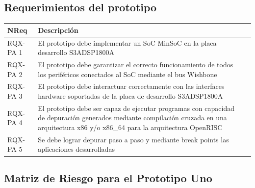 		\subsection{Requerimientos del prototipo}
		\begin{table}[h]
		\centering
		\begin{tabular}{ p{2.5cm} p{8cm} p{3cm} }
		\hline 
		\rowcolor[gray]{0.8} N\textordmasculine Req & Descripción\\
		\hline 
		RQX-PA 1 & El prototipo debe implementar un SoC MinSoC en la placa desarrollo S3ADSP1800A\\ 
		\hline 
		RQX-PA 2 & El prototipo debe garantizar el correcto funcionamiento de todos los periféricos conectados al SoC mediante el bus Wishbone\\ 
		\hline 
		RQX-PA 3 & El prototipo debe interactuar correctamente con las interfaces hardware soportadas de la placa de desarrollo S3ADSP1800A\\ 
		\hline
		RQX-PA 4 & El prototipo debe ser capaz de ejecutar programas con capacidad de depuración generados mediante compilación
		cruzada en una arquitectura x86 y/o x86\_64 para la arquitectura OpenRISC\\
		\hline
		RQX-PA 5 & Se debe lograr depurar paso a paso y mediante break points las aplicaciones desarrolladas\\
		\hline		
		\end{tabular}
		\end{table}

\newpage
	


\newpage
\subsection{Matriz de Riesgo para el Prototipo Uno}

